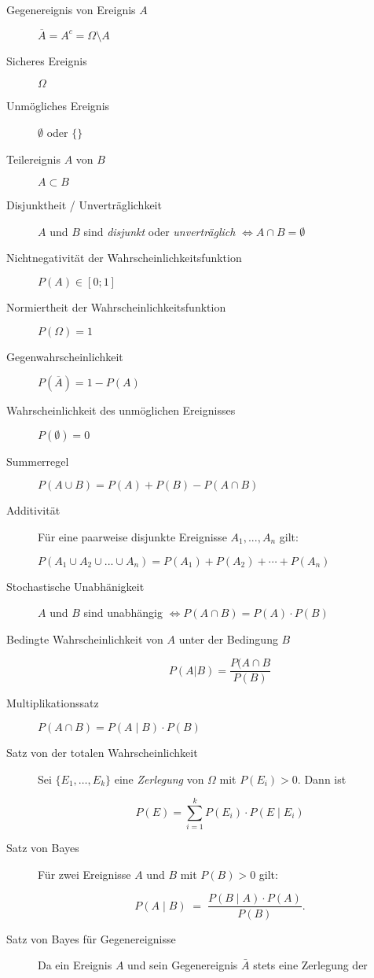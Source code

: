 \documentclass[8pt,landscape]{scrartcl}
\begin{document}
\begin{multicols}{3}
\begin{description}
\item[Gegenereignis von Ereignis \(A\)]
\(\overline{A} = A^c = \Omega \setminus A\)
\item[Sicheres Ereignis]
\(\Omega\)
\item[Unmögliches Ereignis]
\(\emptyset\) oder \(\{\}\)
\item[Teilereignis \(A\) von \(B\)]
\(A \subset B\)
\item[Disjunktheit / Unverträglichkeit]
\(A\) und \(B\) sind \emph{disjunkt} oder \emph{unverträglich}
\(\Longleftrightarrow A \cap B = \emptyset\)
\item[Nichtnegativität der Wahrscheinlichkeitsfunktion]
\(P(A) \in [0; 1]\)
\item[Normiertheit der Wahrscheinlichkeitsfunktion]
\(P(\Omega) = 1\)
\item[Gegenwahrscheinlichkeit]
\(P(\overline{A})=1-P(A)\)
\item[Wahrscheinlichkeit des unmöglichen Ereignisses]
\(P(\emptyset)=0\)
\item[Summerregel]
\(P(A \cup B) = P(A) + P(B) - P(A \cap B)\)
\item[Additivität]
Für eine paarweise disjunkte Ereignisse \(A_1,...,A_n\) gilt:

\(P(A_1 \cup A_2 \cup ... \cup A_n) = P(A_1) + P(A_2) + \cdots + P(A_n)\)
\item[Stochastische Unabhänigkeit]
\(A\) und \(B\) sind unabhängig
\(\Longleftrightarrow P(A \cap B) = P(A) \cdot P(B)\)
\item[Bedingte Wahrscheinlichkeit von \(A\) unter der Bedingung \(B\)]
\begin{equation*}
    P(A | B) = \frac{P(A \cap B}{P(B)}
\end{equation*}
\item[Multiplikationssatz]
\(P(A\cap B) = P(A\mid B) \cdot P(B)\)
\item[Satz von der totalen Wahrscheinlichkeit]
Sei \(\{E_1, \dots, E_k\}\) eine \emph{Zerlegung} von \(\Omega\) mit
\(P(E_i) > 0\). Dann ist

\begin{equation*}
    P(E) = \sum\limits_{i=1}^{k} P(E_i) \cdot P(E \mid E_i)
\end{equation*}
\item[Satz von Bayes]
Für zwei Ereignisse \(A\) und \(B\) mit \(P(B) > 0\) gilt:

\begin{equation*}
    P(A \mid B) \; = \; \frac {P(B \mid A) \cdot P(A)} {P(B)}.
\end{equation*}
\item[Satz von Bayes für Gegenereignisse]
Da ein Ereignis \(A\) und sein Gegenereignis \(\bar{A}\) stets eine
Zerlegung der


\end{description}
\end{multicols}
\end{document}
